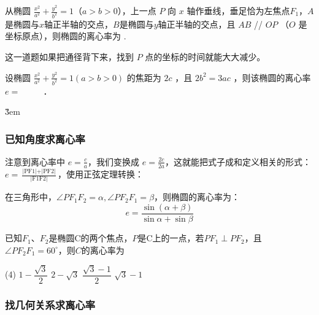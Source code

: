 \vspace{1em}

\begin{example}
    从椭圆 \(\frac{x^2}{a^2} + \frac{y^2}{b^2} = 1\)（\(a > b > 0\)），上一点 $P$ 向 $x$ 轴作垂线，垂足恰为左焦点\(F_1\)，\(A\)是椭圆与$x$轴正半轴的交点，\(B\)是椭圆与$y$轴正半轴的交点，且 \(AB\) // \(OP\) （$O$ 是坐标原点），则椭圆的离心率为 \underline{\hspace{1.5cm}}.
\end{example}

\begin{tips}
    这一道题如果把通径背下来，找到 $P$ 点的坐标的时间就能大大减少。
\end{tips}

\vspace{3em}

\begin{example}
    设椭圆 $\frac{x^2}{a^2}+\frac{y^2}{b^2}=1(a>b>0)$ 的焦距为 $2 c$ ，且 $2 b^2=3 a c$ ，则该椭圆的离心率 $e=$ $\qquad$ ．
\end{example}

\v{3em}

\subsubsection{已知角度求离心率}

\begin{theorem}
    注意到离心率中 $e = \frac{c}{a}$，我们变换成 $e = \frac{2c}{2a}$，这就能把式子成和定义相关的形式：$e = \frac{\text{|PF1|} + \text{|PF2|}}{\text{|F1F2|}}$，使用正弦定理转换：

    在三角形中，$\angle PF_1F_2 = \alpha, \angle PF_2F_1 = \beta$，则椭圆的离心率为：
    $$e = \frac{\sin(\alpha + \beta)}{\sin \alpha + \sin \beta}$$
\end{theorem}


\begin{example}
    已知$F_1$、$F_2$是椭圆C的两个焦点，$P$是C上的一点，若$P F_1 \perp P F_2$，且$\angle P F_2 F_1 = 60^\circ$，则$C$的离心率为
    \begin{tasks}(4)
        \task $ 1- \dfrac{\sqrt{3}}{2}$
        \task $2 - \sqrt{3}$
        \task $\dfrac{\sqrt{3} - 1}{2}$
        \task $\sqrt{3} - 1$
    \end{tasks}
\end{example}

\subsubsection{找几何关系求离心率}

